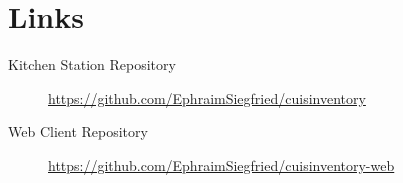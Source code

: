 \documentclass{article}
\begin{document}
\section{Links}

\begin{description}
	\item [Kitchen Station Repository]\url{https://github.com/EphraimSiegfried/cuisinventory}
	\item[Web Client Repository] \url{https://github.com/EphraimSiegfried/cuisinventory-web}
\end{description}
\end{document}
